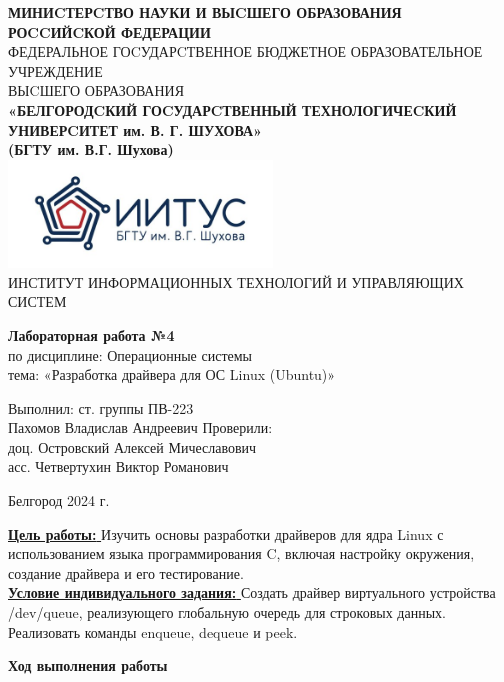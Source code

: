 \documentclass[a4paper,14pt]{extarticle}
\newcommand\textbox[1]{
	\parbox{.45\textwidth}{#1}
}
\begin{document}
\begin{center}
    \small{
        \textbf{МИНИCТЕРCТВО НАУКИ И ВЫCШЕГО ОБРАЗОВАНИЯ РОCCИЙCКОЙ ФЕДЕРАЦИИ}\\
        ФЕДЕРАЛЬНОЕ ГОCУДАРCТВЕННОЕ БЮДЖЕТНОЕ ОБРАЗОВАТЕЛЬНОЕ УЧРЕЖДЕНИЕ\\ВЫCШЕГО ОБРАЗОВАНИЯ \\
        \textbf{«БЕЛГОРОДCКИЙ ГОCУДАРCТВЕННЫЙ ТЕХНОЛОГИЧЕCКИЙ\\УНИВЕРCИТЕТ им. В. Г. ШУХОВА»\\ (БГТУ им. В.Г. Шухова)} \\
        \bigbreak
        \includegraphics[width=70mm]{log}\\
        ИНСТИТУТ ИНФОРМАЦИОННЫХ ТЕХНОЛОГИЙ И УПРАВЛЯЮЩИХ СИСТЕМ\\}
\end{center}

\vfill
\begin{center}
    \large{
        \textbf{
            Лабораторная работа №4}}\\
    \normalsize{
        по дисциплине: Операционные системы \\
        тема: «Разработка драйвера для ОС Linux (Ubuntu)»}
\end{center}
\vfill
\hfill\textbox{
    Выполнил: ст. группы ПВ-223\\Пахомов Владислав Андреевич
    \bigbreak
    Проверили: \\доц. Островский Алексей Мичеславович\\
    асс. Четвертухин Виктор Романович
}
\vfill\begin{center}
    Белгород 2024 г.
\end{center}
\newpage
\underline{\textbf{Цель работы: }}Изучить основы разработки драйверов для ядра Linux с использованием языка
программирования C, включая настройку окружения, создание драйвера и его тестирование.\\
\underline{\textbf{Условие индивидуального задания: }}Создать драйвер виртуального устройства /dev/queue, реализующего глобальную очередь для
строковых данных. Реализовать команды enqueue, dequeue и peek.\\
\begin{center}
\textbf{Ход выполнения работы}
\end{center}
\end{document}
